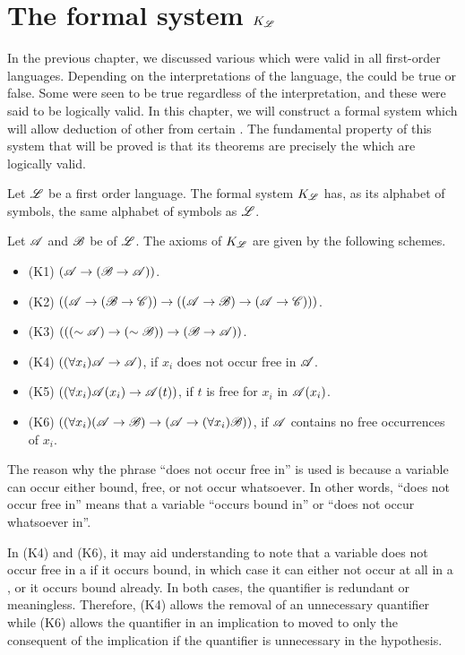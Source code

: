\section{The formal system \texorpdfstring{\(K_{\mathscr{L}}\)}{KL}}

In the previous chapter, we discussed various \wfs{} which were valid in all first-order languages. Depending on the interpretations of the language, the \wfs{} could be true or false. Some \wfs{} were seen to be true regardless of the interpretation, and these \wfs{} were said to be logically valid. In this chapter, we will construct a formal system which will allow deduction of other \wfs{} from certain \wfs{}. The fundamental property of this system that will be proved is that its theorems are precisely the \wfs{} which are logically valid.
  
Let \(\mathscr{L}\) be a first order language. The formal system \(K_{\mathscr{L}}\) has, as its alphabet of symbols, the same alphabet of symbols as \(\mathscr{L}\).

Let \(\mathscr{A}\) and \(\mathscr{B}\) be \wfs{} of \(\mathscr{L}\). The axioms of \(K_{\mathscr{L}}\) are given by the following schemes.
\begin{itemize}
  \item (K1) \((\mathscr{A} \rightarrow (\mathscr{B} \rightarrow \mathscr{A}))\).

  \item (K2) \(((\mathscr{A} \rightarrow (\mathscr{B} \rightarrow \mathscr{C})) \rightarrow ((\mathscr{A} \rightarrow \mathscr{B}) \rightarrow (\mathscr{A} \rightarrow \mathscr{C})))\).

  \item (K3) \((((\sim \mathscr{A}) \rightarrow (\sim \mathscr{B})) \rightarrow (\mathscr{B} \rightarrow \mathscr{A}))\).

  \item (K4) \(((\forall x_i) \mathscr{A} \rightarrow \mathscr{A})\), if \(x_i\) does not occur free in \(\mathscr{A}\).

  \item (K5) \(((\forall x_i) \mathscr{A}(x_i) \rightarrow \mathscr{A}(t))\), if \(t\) is free for \(x_i\) in \(\mathscr{A}(x_i)\).

  \item (K6) \(((\forall x_i)(\mathscr{A} \rightarrow \mathscr{B}) \rightarrow (\mathscr{A} \rightarrow (\forall x_i)\mathscr{B}))\), if \(\mathscr{A}\) contains no free occurrences of \(x_i\).
\end{itemize}

\note{} The reason why the phrase ``does not occur free in'' is used is because a variable can occur either bound, free, or not occur whatsoever. In other words, ``does not occur free in'' means that a variable ``occurs bound in'' or ``does not occur whatsoever in''.

\note{} In (K4) and (K6), it may aid understanding to note that a variable does not occur free in a \wf{} if it occurs bound, in which case it can either not occur at all in a \wf{}, or it occurs bound already. In both cases, the quantifier is redundant or meaningless. Therefore, (K4) allows the removal of an unnecessary quantifier while (K6) allows the quantifier in an implication to moved to only the consequent of the implication if the quantifier is unnecessary in the hypothesis.

